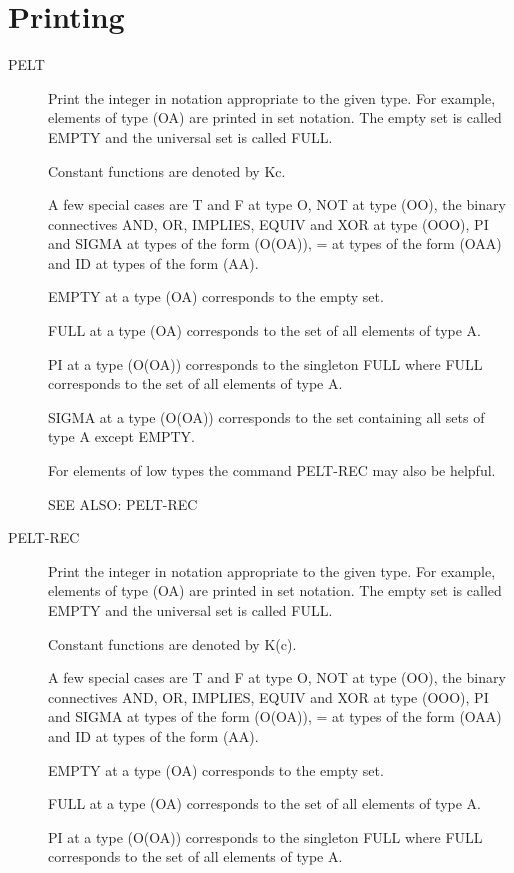 \section{Printing}

\begin{description} 
\item[PELT]  
Print the integer in notation appropriate to the given type.
For example, elements of type (OA) are printed in set notation.
The empty set is called EMPTY and the universal set is called FULL.

Constant functions are denoted by Kc.

A few special cases are T and F at type O, NOT at type (OO),
the binary connectives AND, OR, IMPLIES, EQUIV and XOR at type (OOO),
PI and SIGMA at types of the form (O(OA)),
= at types of the form (OAA) and 
ID at types of the form (AA).

EMPTY at a type (OA) corresponds to the empty set.

FULL at a type (OA) corresponds to the set of all elements of type A.

PI at a type (O(OA)) corresponds to the singleton {FULL} where FULL 
corresponds to the set of all elements of type A.

SIGMA at a type (O(OA)) corresponds to the set containing all sets of
type A except EMPTY.

For elements of low types the command PELT-REC may also be helpful.

SEE ALSO: PELT-REC

\item[PELT-REC]  
Print the integer in notation appropriate to the given type.
For example, elements of type (OA) are printed in set notation.
The empty set is called EMPTY and the universal set is called FULL.

Constant functions are denoted by K(c).

A few special cases are T and F at type O, NOT at type (OO), 
the binary connectives AND, OR, IMPLIES, EQUIV and XOR at type (OOO),
PI and SIGMA at types of the form (O(OA)),
= at types of the form (OAA) and 
ID at types of the form (AA).

EMPTY at a type (OA) corresponds to the empty set.

FULL at a type (OA) corresponds to the set of all elements of type A.

PI at a type (O(OA)) corresponds to the singleton {FULL} where FULL 
corresponds to the set of all elements of type A.


\end{description}
